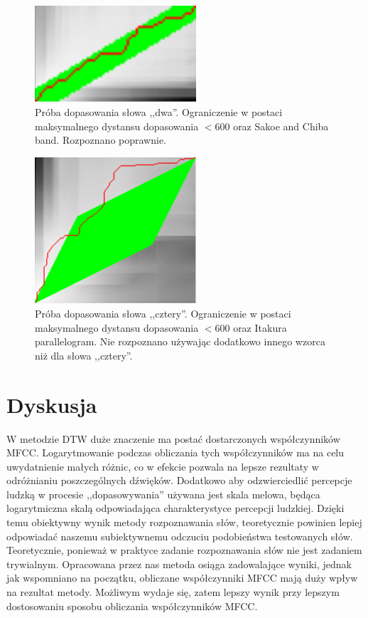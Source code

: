 \documentclass{classrep}
\begin{document}
\begin{figure}[H]
\centering
\includegraphics[width=6cm]{dtw_s_dwa.PNG} 
\caption{Próba dopasowania słowa ,,dwa''. Ograniczenie w postaci maksymalnego dystansu dopasowania $<600$ oraz Sakoe and Chiba band. Rozpoznano poprawnie.}
\label{fig:dtw_s_dwa}
\end{figure}

\begin{figure}[H]
\centering
\includegraphics[width=6cm]{dtw_i_cztery.PNG} 
\caption{Próba dopasowania słowa ,,cztery''. Ograniczenie w postaci maksymalnego dystansu dopasowania $<600$ oraz Itakura parallelogram. Nie rozpoznano używając dodatkowo innego wzorca niż dla słowa ,,cztery''.}
\label{fig:dtw_i_cztery}
\end{figure}

\section{Dyskusja}
W metodzie DTW duże znaczenie ma postać dostarczonych współczynników MFCC. Logarytmowanie podczas obliczania tych współczynników ma na celu uwydatnienie małych różnic, co w efekcie pozwala na lepsze rezultaty w odróżnianiu poszczególnych dźwięków. Dodatkowo aby odzwierciedlić percepcje ludzką w procesie ,,dopasowywania'' używana jest skala melowa, będąca logarytmiczna skalą odpowiadająca charakterystyce percepcji ludzkiej. Dzięki temu obiektywny wynik metody rozpoznawania słów, teoretycznie powinien lepiej odpowiadać naszemu subiektywnemu odczuciu podobieństwa testowanych słów. Teoretycznie, ponieważ w praktyce zadanie rozpoznawania słów nie jest zadaniem trywialnym. Opracowana przez nas metoda osiąga zadowalające wyniki, jednak jak wspomniano na początku, obliczane współczynniki MFCC mają duży wpływ na rezultat metody. Możliwym wydaje się, zatem lepszy wynik przy lepszym dostosowaniu sposobu obliczania współczynników MFCC.
\end{document}

